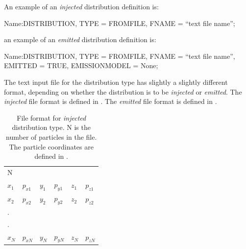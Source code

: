 An example of an \emph{injected}  distribution definition is:

\begin{example}
Name:DISTRIBUTION, TYPE = FROMFILE,
                   FNAME = ``text file name'';
\end{example}
an example of an \emph{emitted}  distribution definition is:

\begin{example}
Name:DISTRIBUTION, TYPE = FROMFILE,
                   FNAME = ``text file name'',
                   EMITTED = TRUE,
                   EMISSIONMODEL = None;
\end{example}

The text input file for the  distribution type has slightly a slightly different
format, depending on whether the distribution is to be \emph{injected} or \emph{emitted}. The
\emph{injected} file format is defined in . The \emph{emitted}
file format is defined in .

\begin{table}[!htb]
  \begin{center}\footnotesize
    \caption{File format for \emph{injected}  distribution type. N is the number
    of particles in the file. The particle coordinates are defined in .}
    \label{tab:fromfileinjfileformat}
    \begin{tabular}{llllll}
      \hline
      N & & & & & \\
      $x_{1}$ & $p_{x1}$ & $y_{1}$ & $p_{y1}$ & $z_{1}$ & $p_{z1}$ \\
      $x_{2}$ & $p_{x2}$ & $y_{2}$ & $p_{y2}$ & $z_{2}$ & $p_{z2}$ \\
      . & & & & & \\
      . & & & & & \\
      $x_{N}$ & $p_{xN}$ & $y_{N}$ & $p_{yN}$ & $z_{N}$ & $p_{zN}$ \\
      \hline
    \end{tabular}
  \end{center}
\end{table}


